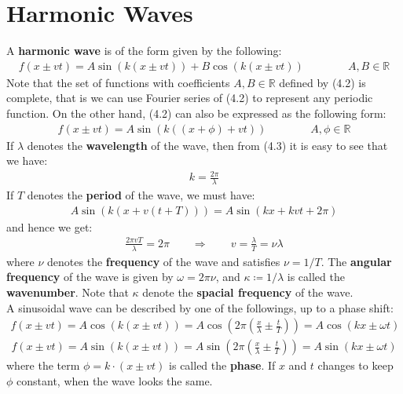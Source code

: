 \documentclass[11pt]{book}
\theoremstyle{break}
\theoremstyle{break}
\newcommand{\R}{\mathbb{R}}
\begin{document}
\section[Harmonic Waves]{\color{red} Harmonic Waves}
A \textbf{harmonic wave} is of the form given by the following:
\begin{align}
f(x\pm vt) = A \sin(k(x\pm vt)) + B \cos(k(x\pm vt)) \qquad \qquad A,B \in \R
\end{align}
Note that the set of functions with coefficients $A,B \in \R$ defined by (4.2) is complete, that is we can use Fourier series of (4.2) to represent any periodic function. On the other hand, (4.2) can also be expressed as the following form:
\begin{align}
f(x\pm vt) = A \sin(k((x+\phi) + vt))  \qquad\qquad A,\phi \in \R
\end{align}
If $\lambda$ denotes the \textbf{wavelength} of the wave, then from (4.3) it is easy to see that we have:
\begin{align*}
k = \frac{2\pi}{\lambda}
\end{align*}
If $T$ denotes the \textbf{period} of the wave, we must have:
\begin{align*}
A \sin\left( k (x+v(t+T))\right) = A\sin\left( k x+kvt+2\pi\right) 
\end{align*}
and hence we get:
\begin{align*}
\frac{2\pi vT}{\lambda} = 2\pi \qquad \Rightarrow \qquad v = \frac{\lambda}{T} = \nu \lambda
\end{align*}
where $\nu$ denotes the \textbf{frequency} of the wave and satisfies $\nu = 1/T$. The \textbf{angular frequency} of the wave is given by $\omega = 2\pi \nu$, and $\kappa \coloneqq 1/\lambda$ is called the \textbf{wavenumber}. Note that $\kappa$ denote the \textbf{spacial frequency} of the wave. \\

A sinusoidal wave can be described by one of the followings, up to a phase shift:
\begin{align*}
f(x\pm vt) = A\cos(k(x\pm vt)) = A\cos\left(2\pi \left( \frac{x}{\lambda}\pm \frac{t}{T}\right) \right) = A\cos(k x \pm \omega t) 
\end{align*}
\begin{align*}
f(x\pm vt) = A\sin(k(x\pm vt)) = A\sin\left(2\pi \left( \frac{x}{\lambda}\pm \frac{t}{T}\right) \right) = A\sin(k x \pm \omega t) 
\end{align*}
where the term $\phi = k\cdot (x\pm vt)$ is called the \textbf{phase}. If $x$ and $t$ changes to keep $\phi$ constant, when the wave looks the same.\\
\end{document}
